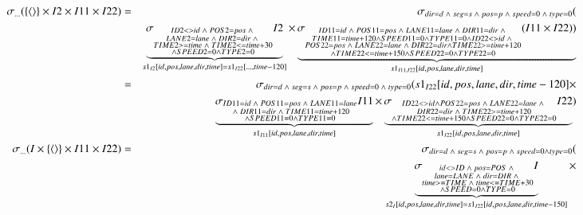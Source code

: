 \begin{eqnarray} 
\sigma_{\dots}(  \{\tuple{} \} \times I2 \times I11 \times I22) &=& 
 \sigma_{dir = d \;\wedge\; seg = s \;\wedge\; pos = p \;\wedge\; speed = 0 \;\wedge\; type = 0 }( \\
\nonumber{}&&\underbrace{\sigma_{\substack {ID2 <> id \;\wedge\; POS2 = pos \;\wedge\; \\LANE2 = lane \; \wedge\; DIR2 = dir \;\wedge \; \\TIME2 >= time \;\wedge\; TIME2 <= time + 30 \\\wedge SPEED2 = 0 \wedge TYPE2 = 0 }}I2 }_{s1_{I2}[id, pos, lane, dir, time] = s1_{I22} [\dots, time -120]}\times 
\underbrace{\sigma_{\substack {ID11 = id \;\wedge\; POS11 = pos \;\wedge\;  LANE11 = lane \;\wedge\; DIR11= dir \;\wedge\; \\ TIME11 = time + 120 \wedge  SPEED11 = 0 \wedge TYPE11 = 0 \wedge ID22 <> id \;\wedge\;\\POS22 = pos \;\wedge\; LANE22 = lane \;\wedge\; DIR22 = dir \wedge  TIME22 >= time + 120 \\\wedge TIME22 <= time + 150 \wedge SPEED22 = 0 \wedge TYPE22 =0}} (I11 \times I22) )}_{s1_{I11,I22}[id, pos, lane, dir, time]}\\ 
%
&=&  \sigma_{dir = d \;\wedge\; seg = s \;\wedge\; pos = p \;\wedge\; speed = 0 \;\wedge\; type = 0 }( s1_{I22}[id, pos, lane, dir, time-120]\times \\
\nonumber{}&&\qquad \underbrace{\sigma_{\substack {ID11 = id \;\wedge\; POS11 = pos \;\wedge\;  LANE11 = lane \\\;\wedge\; DIR11= dir \;\wedge\;  TIME11 = time + 120 \\\wedge  SPEED11 = 0 \wedge TYPE11 = 0}} I11}_{s1_{I11}[id, pos, lane, dir, time] } \times 
\underbrace {\sigma_{\substack{ ID22 <> id  \wedge POS22 = pos \;\wedge\; LANE22 = lane \;\wedge\; \\DIR22 = dir \;\wedge\; TIME22 >= time + 120 \\\wedge TIME22 <= time + 150 \wedge SPEED22 = 0 \wedge TYPE22 =0}} I22}_{s1_{I22}[id, pos, lane, dir, time]} )\\ 
\sigma_{\dots}(I \times \{\tuple{} \} \times I11 \times I22) &=&
\sigma_{\substack{dir = d \;\wedge\; seg = s \;\wedge\; pos = p \;\wedge\; speed = 0 \wedge type = 0 }}(\\
\nonumber{}&& \underbrace{\sigma_{\substack{id <> ID \;\wedge\; pos = POS \;\wedge\; \\lane = LANE \;\wedge\; dir = DIR \;\wedge\; \\time >= TIME \;\wedge\; time <= TIME + 30 \\\wedge SPEED = 0 \wedge TYPE = 0 }} I}_{s2_{I}[id, pos, lane, dir, time]=s1_{I22}[id, pos, lane, dir, time-150]} \times 

\end{eqnarray}
